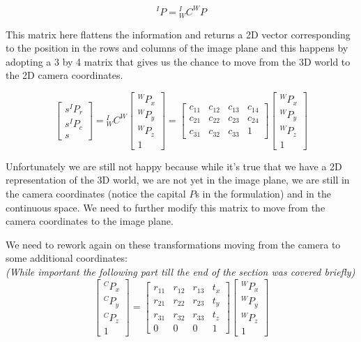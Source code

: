 \[
    {}^IP = {}^I_W C^WP
\]

This matrix here flattens the information and returns a 2D vector corresponding to the position in the rows and columns of the image plane and this happens by adopting a 3 by 4 matrix that gives us the chance to move from the 3D world to the 2D camera coordinates.

\[
    \begin{bmatrix}
        s^IP_r \\
        s^IP_c \\
        s
    \end{bmatrix}
    =
    {}^I_W C^W
    \begin{bmatrix}
        {}^WP_x \\
        {}^WP_y \\
        {}^WP_z \\
        1
    \end{bmatrix}  
    = 
    \begin{bmatrix}
        c_{11} & c_{12} & c_{13} & c_{14} \\
        c_{21} & c_{22} & c_{23} & c_{24} \\
        c_{31} & c_{32} & c_{33} & 1
    \end{bmatrix}
    \begin{bmatrix}
        {}^WP_x \\
        {}^WP_y \\
        {}^WP_z \\
        1
    \end{bmatrix}
\]

Unfortunately we are still not happy because while it's true that we have a 2D representation of the 3D world, we are not yet in the image plane, we are still in the camera coordinates (notice the capital \(P\)s in the formulation) and in the continuous space. We need to further modify this matrix to move from the camera coordinates to the image plane.

We need to rework again on these transformations moving from the camera to some additional coordinates:\\
\textit{(While important the following part till the end of the section was covered briefly)}
\[
    \begin{bmatrix}
        {}^CP_x \\
        {}^CP_y \\
        {}^CP_z \\
        1
    \end{bmatrix}
    =
    \begin{bmatrix}
       r_{11} & r_{12} & r_{13} & t_x \\
       r_{21} & r_{22} & r_{23} & t_y \\
       r_{31} & r_{32} & r_{33} & t_z \\
        0 & 0 & 0 & 1
    \end{bmatrix}
    \begin{bmatrix}
        {}^WP_x \\
        {}^WP_y \\
        {}^WP_z \\
        1
    \end{bmatrix}   
\]

